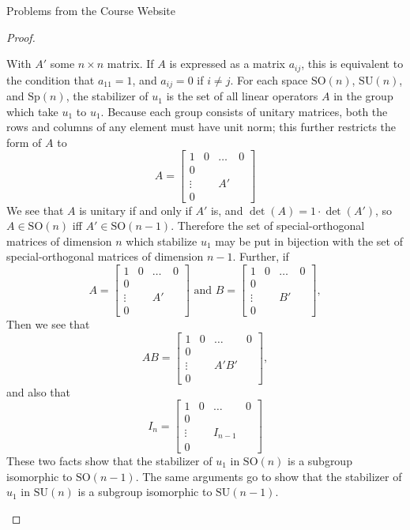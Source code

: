 \documentclass[12pt]{article}
\theoremstyle{definition}
\newenvironment{problem}[2][Problem]{\begin{trivlist}
\item[\hskip \labelsep {\bfseries #1}\hskip \labelsep {\bfseries #2.}]}{\end{trivlist}}
\begin{document}
\begin{section}{Problems from the Course Website}
\begin{problem}{2}
\begin{proof}
\begin{enumerate}[label=(\alph*)]
			    With $A'$ some $n\times n$ matrix. If $A$ is expressed as a matrix $a_{ij}$, this is equivalent to the condition that $a_{11} = 1$, and $a_{ij} = 0$ if $i \neq j$. For each space $\text{SO}(n)$, $\text{SU}(n)$, and $\text{Sp}(n)$, the stabilizer of $u_1$ is the set of all linear operators $A$ in the group which take $u_1$ to $u_1$. Because each group consists of unitary matrices, both the rows and columns of any element must have unit norm; this further restricts the form of $A$ to 
			    \[A = \begin{bmatrix}
			    1 & 0 & \dots &  0\\
			    0 & & & \\
			    \vdots & & A' & \\
			    0 & & & 
	    \end{bmatrix} \]We see that $A$ is unitary if and only if $A'$ is, and $\det(A) = 1 \cdot \det(A')$, so $A \in \text{SO}(n)$ iff $A' \in \text{SO}(n-1)$. Therefore the set of special-orthogonal matrices of dimension $n$ which stabilize $u_1$ may be put in bijection with the set of special-orthogonal matrices of dimension $n-1$. Further, if 
	    \[A = \begin{bmatrix}
			    1 & 0 & \dots &  0\\
			    0 & & & \\
			    \vdots & & A' & \\
			    0 & & & 
	    \end{bmatrix} \text{ and } B = \begin{bmatrix}
			    1 & 0 & \dots &  0\\
			    0 & & & \\
			    \vdots & & B' & \\
			    0 & & & 
	    \end{bmatrix}, \]
	    Then we see that
	    \[AB = \begin{bmatrix}
			    1 & 0 & \dots &  0\\
			    0 & & & \\
			    \vdots & & A'B' & \\
			    0 & & & 
	    \end{bmatrix}, \]
	    and also that 
	    \[I_n = \begin{bmatrix}
			    1 & 0 & \dots &  0\\
			    0 & & & \\
			    \vdots & & I_{n-1} & \\
			    0 & & & 
	    \end{bmatrix}\]
	    These two facts show that the stabilizer of $u_1$ in $\text{SO}(n)$ is a subgroup isomorphic to $\text{SO}(n-1)$. The same arguments go to show that the stabilizer of $u_1$ in $\text{SU}(n)$ is a subgroup isomorphic to $\text{SU}(n-1)$. 

\end{enumerate}
\end{proof}
\end{problem}
\end{section}
\end{document}
